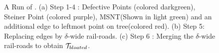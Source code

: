 \begin{figure}[H]
	\centering
	\caption{A Run of . (a) Step 1-4 : Defective Points (colored darkgreen), Steiner Point (colored purple), MSNT(Shown in light green) and an additional edge to leftmost point on tree(colored red). (b) Step 5: Replacing edges by $\delta$-wide rail-roads. (c) Step 6 : Merging the $\delta$-wide rail-roads to obtain $\mathcal T_{bloated}$.}
	\label{fig:gen2}
\end{figure}


\pagebreak